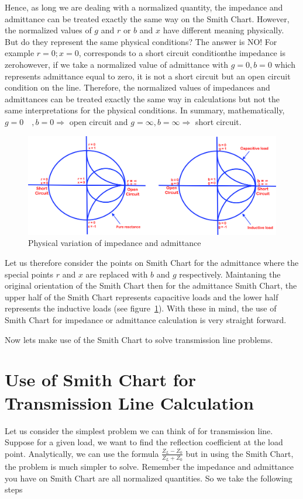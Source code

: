 Hence, as long we are dealing with a normalized quantity, the impedance and admittance can be treated exactly the same way on the Smith Chart. However, the normalized values of $g$ and $r$ or $b$ and $x$ have different meaning physically. But do they represent the same physical conditions? The answer is NO! For example $r = 0; x = 0$, corresponds to a short circuit condition\textemdash\;the impedance is zero\textemdash\;however, if we take  a normalized value of admittance with $g=0, b=0$ which represents admittance equal to zero, it is not a short circuit but an open circuit condition on the line. Therefore, the normalized values of impedances and admittances can be treated exactly the same way in calculations but not the same interpretations for the physical conditions. In summary, mathematically, $g = 0\quad, b = 0\Longrightarrow$ open circuit and $g = \infty, b = \infty \Longrightarrow$  short circuit. 
\begin{figure}[h]
\centering
\includegraphics[width=1\linewidth]{./graphics/jnbkvfld}
\caption{Physical variation of impedance and admittance}
\label{fig:jnbkvfld}
\end{figure}

Let us therefore consider the points on Smith Chart for the admittance where the special points $r$ and $x$ are replaced with $b$ and $g$ respectively. Maintaning the original orientation of the Smith Chart then for the admittance Smith Chart, the upper half of the Smith Chart represents capacitive loads and the lower half represents the inductive loads (see figure~\ref{fig:jnbkvfld}). With these in mind, the use of Smith Chart for impedance or admittance calculation is very straight forward.

Now lets make use of the Smith Chart to solve transmission line problems. 

\section{Use of Smith Chart for Transmission Line Calculation}
Let us consider the simplest problem we can think of for transmission line. Suppose for a given load, we want to find the reflection coefficient at the load point. Analytically, we can use the formula $\frac{Z_L - Z_0}{Z_L + Z_0}$ but in using the Smith Chart, the problem is much simpler to solve. Remember the impedance and admittance you have on Smith Chart are all normalized quantities. So we take the following steps

